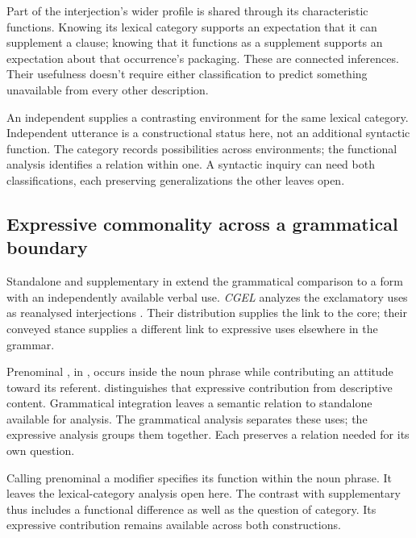 \documentclass[12pt]{article}
\begin{document}
Part of the interjection's wider profile is shared through its
characteristic functions. Knowing its lexical category supports an expectation
that it can supplement a clause; knowing that it functions as a
supplement supports an expectation about that occurrence's packaging.
These are connected inferences. Their usefulness doesn't require either
classification to predict something unavailable from every other description.

An independent  supplies a contrasting environment for
the same lexical category. Independent utterance is a constructional
status here, not an additional syntactic function. The category records
possibilities across environments; the functional analysis identifies a
relation within one. A syntactic inquiry can need both classifications,
each preserving generalizations the other leaves open.

\subsection{Expressive commonality across a grammatical boundary}\label{sec:damn-profiles}

Standalone  and supplementary  in
 extend the grammatical comparison
to a form with an independently available verbal use. \textit{CGEL}
analyzes the exclamatory uses as reanalysed interjections
\citep[1361]{HuddlestonPullum2002}. Their distribution supplies the link
to the core; their conveyed stance supplies a different link to
expressive uses elsewhere in the grammar.

Prenominal , in , occurs inside the
noun phrase while contributing an attitude toward its referent.
\textcite[171, 182]{potts2007} distinguishes that expressive contribution
from descriptive content. Grammatical integration leaves a
semantic relation to standalone  available for analysis.
The grammatical analysis separates these uses; the expressive analysis
groups them together. Each preserves a relation needed for its own
question.

Calling prenominal  a modifier specifies its function
within the noun phrase. It leaves the lexical-category analysis open
here. The contrast with supplementary  thus includes a
functional difference as well as the question of category. Its expressive
contribution remains available across both constructions.
\end{document}
